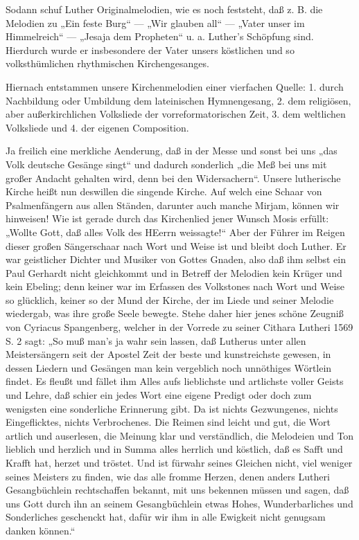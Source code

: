 Sodann schuf Luther Originalmelodien, wie es noch feststeht, daß z. B. die Melodien zu „Ein feste Burg“ — „Wir glauben all“ — „Vater unser im Himmelreich“ — „Jesaja dem Propheten“ u. a. Luther’s Schöpfung sind. Hierdurch wurde er insbesondere der Vater unsers köstlichen und so volksthümlichen rhythmischen Kirchengesanges.

Hiernach entstammen unsere Kirchenmelodien einer vierfachen Quelle: 1. durch Nachbildung oder Umbildung dem lateinischen Hymnengesang, 2. dem religiösen, aber außerkirchlichen Volksliede der vorreformatorischen Zeit, 3. dem weltlichen Volksliede und 4. der eigenen Composition.

Ja freilich eine merkliche Aenderung, daß in der Messe und sonst bei uns „das Volk deutsche Gesänge singt“ und dadurch sonderlich „die Meß bei uns mit großer Andacht gehalten wird, denn bei den Widersachern“. Unsere lutherische Kirche heißt nun deswillen die singende Kirche. Auf welch eine Schaar von Psalmenfängern aus allen Ständen, darunter auch manche Mirjam, können wir hinweisen! Wie ist gerade durch das Kirchenlied jener Wunsch Mosis erfüllt: „Wollte Gott, daß alles Volk des HEerrn weissagte!“ Aber der Führer im Reigen dieser großen Sängerschaar nach Wort und Weise ist und bleibt doch Luther. Er war geistlicher Dichter und Musiker von Gottes Gnaden, also daß ihm selbst ein Paul Gerhardt nicht gleichkommt und in Betreff der Melodien kein Krüger und kein Ebeling; denn keiner war im Erfassen des Volkstones nach Wort und Weise so glücklich, keiner so der Mund der Kirche, der im Liede und seiner Melodie wiedergab, was ihre große Seele bewegte. Stehe daher hier jenes schöne Zeugniß von Cyriacus Spangenberg, welcher in der Vorrede zu seiner Cithara Lutheri 1569 S. 2
sagt: „So muß man’s ja wahr sein lassen, daß Lutherus unter allen Meistersängern seit der Apostel Zeit der beste und kunstreichste gewesen, in dessen Liedern und Gesängen man kein vergeblich noch unnöthiges Wörtlein findet. Es fleußt und fället ihm Alles aufs lieblichste und artlichste voller Geists und Lehre, daß schier ein jedes Wort eine eigene Predigt oder doch zum wenigsten eine sonderliche Erinnerung gibt. Da ist nichts Gezwungenes, nichts Eingeflicktes, nichts Verbrochenes. Die Reimen sind leicht und gut, die Wort artlich und auserlesen, die Meinung klar und verständlich, die Melodeien und Ton lieblich und herzlich und in Summa alles herrlich und köstlich, daß es Safft und Krafft hat, herzet und tröstet. Und ist fürwahr seines Gleichen nicht, viel weniger seines Meisters zu finden, wie das alle fromme Herzen, denen anders Lutheri Gesangbüchlein rechtschaffen bekannt, mit uns bekennen müssen und sagen, daß uns Gott durch ihn an seinem Gesangbüchlein etwas Hohes, Wunderbarliches und Sonderliches geschenckt hat, dafür wir ihm in alle Ewigkeit nicht genugsam danken können.“


